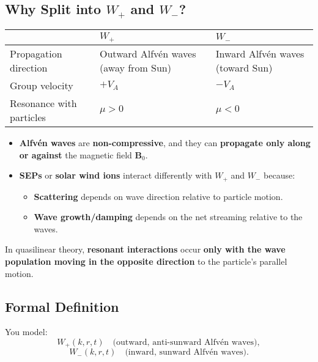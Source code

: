 \hrulefill



\subsection{Why Split into $W_+$ and $W_-$?}

\begin{center}
\begin{tabular}{@{}lll@{}}
\toprule
& $W_+$ & $W_-$ \\
\midrule
Propagation direction    & Outward Alfvén waves (away from Sun) & Inward Alfvén waves (toward Sun) \\
Group velocity           & $+V_A$                               & $-V_A$                           \\
Resonance with particles & $\mu > 0$                            & $\mu < 0$                        \\
\bottomrule
\end{tabular}
\end{center}

\begin{itemize}
    \item \textbf{Alfvén waves} are \textbf{non-compressive}, and they can \textbf{propagate only along or against} the magnetic field $\mathbf{B}_0$.
    \item \textbf{SEPs} or \textbf{solar wind ions} interact differently with $W_+$ and $W_-$ because:
    \begin{itemize}
        \item \textbf{Scattering} depends on wave direction relative to particle motion.
        \item \textbf{Wave growth/damping} depends on the net streaming relative to the waves.
    \end{itemize}
\end{itemize}

In quasilinear theory, \textbf{resonant interactions} occur \textbf{only with the wave population moving in the opposite direction} to the particle's parallel motion.

\hrulefill

\subsection*{Formal Definition}

You model:
\[
W_+(k, r, t) \quad \text{(outward, anti-sunward Alfvén waves)},
\]
\[
W_-(k, r, t) \quad \text{(inward, sunward Alfvén waves)}.
\]

